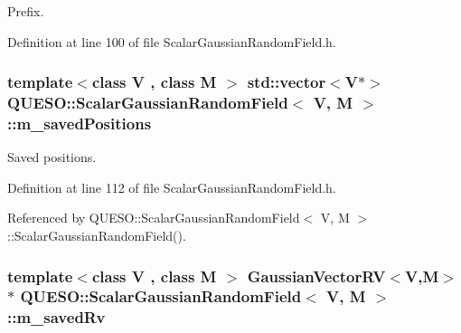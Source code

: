 Prefix. 



Definition at line 100 of file Scalar\-Gaussian\-Random\-Field.\-h.

\hypertarget{class_q_u_e_s_o_1_1_scalar_gaussian_random_field_a5993884088927e1eb818cb8d473c5be8}{
\subsubsection[{m\-\_\-saved\-Positions}]{\setlength{\rightskip}{0pt plus 5cm}template$<$class V , class M $>$ std\-::vector$<$V$\ast$$>$ {\bf Q\-U\-E\-S\-O\-::\-Scalar\-Gaussian\-Random\-Field}$<$ V, M $>$\-::m\-\_\-saved\-Positions\hspace{0.3cm}{\ttfamily [protected]}}}\label{class_q_u_e_s_o_1_1_scalar_gaussian_random_field_a5993884088927e1eb818cb8d473c5be8}


Saved positions. 



Definition at line 112 of file Scalar\-Gaussian\-Random\-Field.\-h.



Referenced by Q\-U\-E\-S\-O\-::\-Scalar\-Gaussian\-Random\-Field$<$ V, M $>$\-::\-Scalar\-Gaussian\-Random\-Field().

\hypertarget{class_q_u_e_s_o_1_1_scalar_gaussian_random_field_ab8ca399444079041b75eb0986fe0fc80}{
\subsubsection[{m\-\_\-saved\-Rv}]{\setlength{\rightskip}{0pt plus 5cm}template$<$class V , class M $>$ {\bf Gaussian\-Vector\-R\-V}$<$V,M$>$$\ast$ {\bf Q\-U\-E\-S\-O\-::\-Scalar\-Gaussian\-Random\-Field}$<$ V, M $>$\-::m\-\_\-saved\-Rv\hspace{0.3cm}{\ttfamily [protected]}}}\label{class_q_u_e_s_o_1_1_scalar_gaussian_random_field_ab8ca399444079041b75eb0986fe0fc80}


